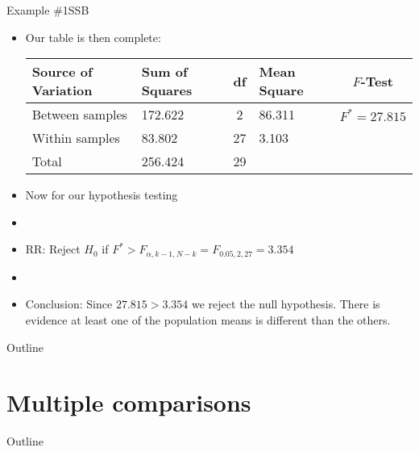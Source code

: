 \documentclass[xcolor=dvipsnames]{beamer}
\begin{document}
\begin{frame}{Example \#1}{SSB}
	\begin{itemize}
		\item Our table is then complete: \pause
		\vspace{2mm}
		\begin{center}
			{\scriptsize
				\begin{tabular}{lp{1.2cm}cp{2.5cm}c}
					\hline 
					\textbf{Source of Variation} & \textbf{Sum of Squares} & \textbf{df} & \textbf{Mean Square} & $F$-\textbf{Test} \\ \hline 
					Between samples & 172.622 & 2 & 86.311 & $F^*=27.815$ \\
					Within samples & 83.802 & 27 &  3.103 & \\
					Total & 256.424 & 29 & & \\ \hline
			\end{tabular}}
		\end{center}\pause
	\vspace{2mm}
	\item Now for our hypothesis testing \pause
	\item[]
	\item RR: Reject $H_0$ if $F^* > F_{\alpha, k-1, N-k} = F_{0.05, 2, 27} =3.354 $\pause
	\item[]
	\item Conclusion: Since $27.815 > 3.354$ we reject the null hypothesis. There is evidence at least one of the population means is different than the others. 
	\end{itemize}
\end{frame}

\begin{frame}{Outline}
\tableofcontents[currentsection,subsectionstyle=show/shaded/hide]
\end{frame}

\section{Multiple comparisons}

\begin{frame}{Outline}
\tableofcontents[currentsection,subsectionstyle=show/shaded/hide]
\end{frame}
\end{document}
